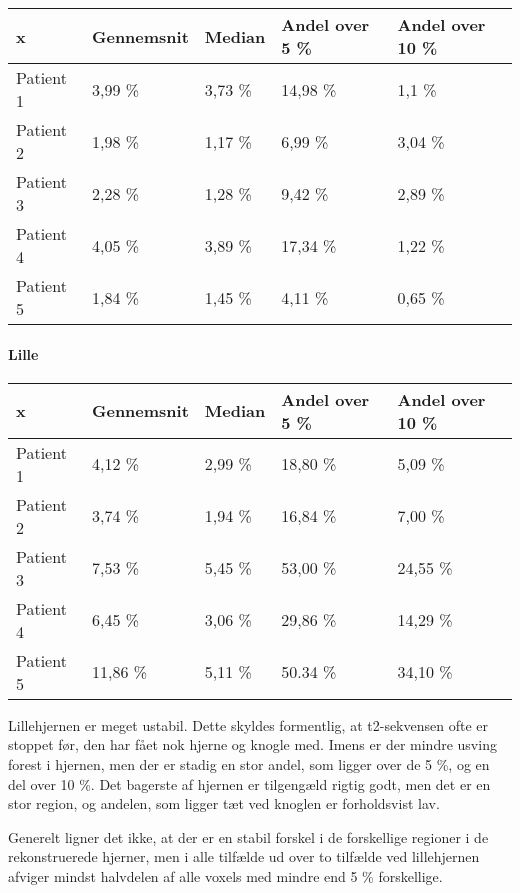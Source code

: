\begin{center}
    \begin{tabular}{| l | l | l | l | l |}
    \hline
    x & Gennemsnit & Median & Andel over 5 \% & Andel over 10 \% \\ \hline
    Patient 1 & 3,99 \% & 3,73 \% & 14,98 \% & 1,1 \% \\ \hline
    Patient 2 & 1,98 \% & 1,17 \% & 6,99 \% & 3,04 \% \\ \hline
    Patient 3 & 2,28 \% & 1,28 \% & 9,42 \% & 2,89 \% \\ \hline
    Patient 4 & 4,05 \% & 3,89 \% & 17,34 \% & 1,22 \% \\ \hline
    Patient 5 & 1,84 \% & 1,45 \% & 4,11 \% & 0,65 \% \\ \hline
    \end{tabular}
\end{center}

\paragraph{Lille}

\begin{center}
    \begin{tabular}{| l | l | l | l | l |}
    \hline
    x & Gennemsnit & Median & Andel over 5 \% & Andel over 10 \% \\ \hline
    Patient 1 & 4,12 \% & 2,99 \% & 18,80 \% & 5,09 \% \\ \hline
    Patient 2 & 3,74 \% & 1,94 \% & 16,84 \% & 7,00 \% \\ \hline
    Patient 3 & 7,53 \% & 5,45 \% & 53,00 \% & 24,55 \% \\ \hline
    Patient 4 & 6,45 \% & 3,06 \% & 29,86 \% & 14,29 \% \\ \hline
    Patient 5 & 11,86 \% & 5,11 \% & 50.34 \% & 34,10 \% \\ \hline
    \end{tabular}
\end{center}

Lillehjernen er meget ustabil. Dette skyldes formentlig, at t2-sekvensen
ofte er stoppet før, den har fået nok hjerne og knogle med. Imens er der
mindre usving forest i hjernen, men der er stadig en stor andel, som
ligger over de 5 \%, og en del over 10 \%. Det bagerste af hjernen er
tilgengæld rigtig godt, men det er en stor region, og andelen, som ligger
tæt ved knoglen er forholdsvist lav.

Generelt ligner det ikke, at der er en stabil forskel i de forskellige
regioner i de rekonstruerede hjerner, men i alle tilfælde ud over to
tilfælde ved lillehjernen afviger mindst halvdelen af alle voxels med
mindre end 5 \% forskellige.


\


